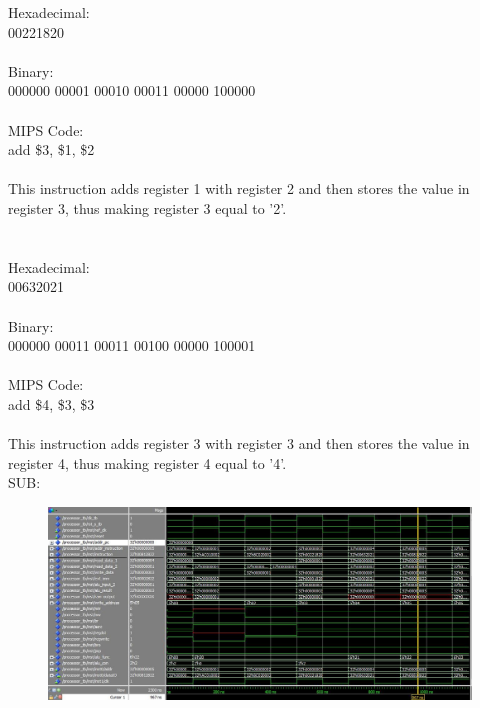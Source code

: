 \documentclass[paper=letter, fontsize=11pt]{scrartcl} %
\numberwithin{equation}{section}
\numberwithin{figure}{section}
\numberwithin{table}{section}
\begin{document}
Hexadecimal:
\\
00221820
\\
\\
Binary:
\\
000000 00001 00010 00011 00000 100000
\\
\\
MIPS Code:
\\
add \$3, \$1, \$2
\\
\\
This instruction adds register 1 with register 2 and then stores the value in register 3, thus making register 3 equal to '2'.
\\
\\
\\
Hexadecimal:
\\
00632021 
\\
\\
Binary:
\\
000000 00011 00011 00100 00000 100001
\\
\\
MIPS Code:
\\
add \$4, \$3, \$3
\\
\\
This instruction adds register 3 with register 3 and then stores the value in register 4, thus making register 4 equal to '4'.
\pagebreak
\\
SUB:

\begin{figure}[H]
	\centering
		\includegraphics[width=150mm]{../sim/photo/sub.JPG}
	\label{fig:SUB}
\end{figure}
\end{document}
